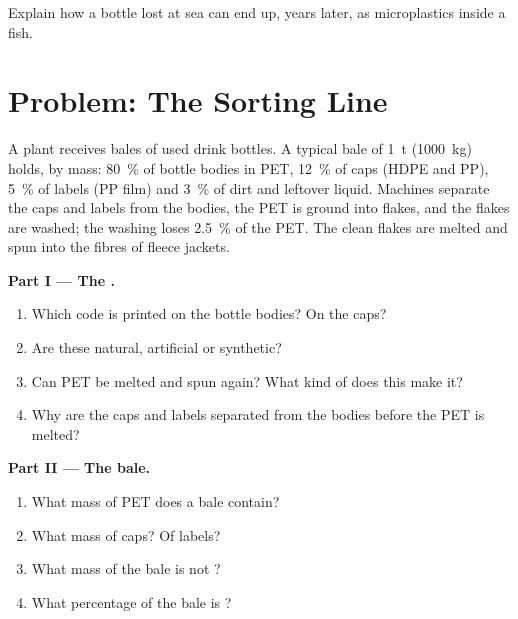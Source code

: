 \begin{exercise}[$\star\star\star$]\label{exo:g8:plastics:12}
Explain how a  bottle lost at sea can end up, years later, as
microplastics inside a fish.
\end{exercise}

\section{Problem: The Sorting Line}

\begin{problem}
\label{pb:g8:plastics:1}
A  plant receives bales of used drink bottles. A typical bale
of \qty{1}{t} (\qty{1000}{kg}) holds, by mass: \qty{80}{\percent} of
bottle bodies in PET, \qty{12}{\percent} of caps (HDPE and PP),
\qty{5}{\percent} of labels (PP film) and \qty{3}{\percent} of dirt and
leftover liquid. Machines separate the caps and labels from the bodies,
the PET is ground into flakes, and the flakes are washed; the washing
loses \qty{2.5}{\percent} of the PET. The clean flakes are melted and
spun into the fibres of fleece jackets.

\medskip
\noindent\textbf{Part I --- The .}
\begin{enumerate}
  \item Which code is printed on the bottle bodies? On the caps?
  \item Are these  natural, artificial or synthetic?
  \item Can PET be melted and spun again? What kind of  does this
        make it?
  \item Why are the caps and labels separated from the bodies before the
        PET is melted?
\end{enumerate}

\medskip
\noindent\textbf{Part II --- The bale.}
\begin{enumerate}[resume]
  \item What mass of PET does a bale contain?
  \item What mass of caps? Of labels?
  \item What mass of the bale is not ?
  \item What percentage of the bale is ?
\end{enumerate}


\end{problem}
